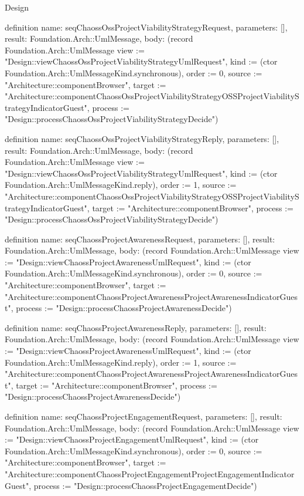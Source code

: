\begin{lexlean}{Design}
\begin{semanticmodule}
definition{
  name: seqChaossOssProjectViabilityStrategyRequest,
  parameters: [],
  result: Foundation.Arch::UmlMessage,
  body: (record Foundation.Arch::UmlMessage {view := "Design::viewChaossOssProjectViabilityStrategyUmlRequest", kind := (ctor Foundation.Arch::UmlMessageKind.synchronous), order := 0, source := "Architecture::componentBrowser", target := "Architecture::componentChaossOssProjectViabilityStrategyOSSProjectViabilityStrategyIndicatorGuest", process := "Design::processChaossOssProjectViabilityStrategyDecide"})
}

definition{
  name: seqChaossOssProjectViabilityStrategyReply,
  parameters: [],
  result: Foundation.Arch::UmlMessage,
  body: (record Foundation.Arch::UmlMessage {view := "Design::viewChaossOssProjectViabilityStrategyUmlRequest", kind := (ctor Foundation.Arch::UmlMessageKind.reply), order := 1, source := "Architecture::componentChaossOssProjectViabilityStrategyOSSProjectViabilityStrategyIndicatorGuest", target := "Architecture::componentBrowser", process := "Design::processChaossOssProjectViabilityStrategyDecide"})
}

definition{
  name: seqChaossProjectAwarenessRequest,
  parameters: [],
  result: Foundation.Arch::UmlMessage,
  body: (record Foundation.Arch::UmlMessage {view := "Design::viewChaossProjectAwarenessUmlRequest", kind := (ctor Foundation.Arch::UmlMessageKind.synchronous), order := 0, source := "Architecture::componentBrowser", target := "Architecture::componentChaossProjectAwarenessProjectAwarenessIndicatorGuest", process := "Design::processChaossProjectAwarenessDecide"})
}

definition{
  name: seqChaossProjectAwarenessReply,
  parameters: [],
  result: Foundation.Arch::UmlMessage,
  body: (record Foundation.Arch::UmlMessage {view := "Design::viewChaossProjectAwarenessUmlRequest", kind := (ctor Foundation.Arch::UmlMessageKind.reply), order := 1, source := "Architecture::componentChaossProjectAwarenessProjectAwarenessIndicatorGuest", target := "Architecture::componentBrowser", process := "Design::processChaossProjectAwarenessDecide"})
}

definition{
  name: seqChaossProjectEngagementRequest,
  parameters: [],
  result: Foundation.Arch::UmlMessage,
  body: (record Foundation.Arch::UmlMessage {view := "Design::viewChaossProjectEngagementUmlRequest", kind := (ctor Foundation.Arch::UmlMessageKind.synchronous), order := 0, source := "Architecture::componentBrowser", target := "Architecture::componentChaossProjectEngagementProjectEngagementIndicatorGuest", process := "Design::processChaossProjectEngagementDecide"})
}


\end{semanticmodule}
\end{lexlean}
